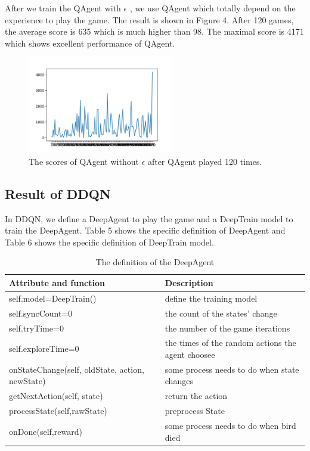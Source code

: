 \documentclass[conference,compsoc]{IEEEtran}
\begin{document}
\indent After we train the QAgent with ${\epsilon}$ , we use QAgent which totally depend on the experience to play the game. The result is shown in Figure 4.  After 120 games, the average score is 635 which is much higher than 98. The maximal score is 4171 which shows excellent performance of QAgent.

\begin{figure}[!t]
\centering
\includegraphics[width=2.5in]{Qlearn_noEp_result.png}
\caption{The scores of QAgent without ${\epsilon}$ after QAgent played 120 times.}
\label{fig3}
\end{figure}

\subsection{Result of DDQN}
In DDQN, we define a DeepAgent to play the game and a DeepTrain model to train the DeepAgent. Table 5 shows the specific definition of DeepAgent and Table 6 shows the specific definition of DeepTrain model.

\begin{table}[!t]
\renewcommand{\arraystretch}{1.3}
\caption{The definition of the DeepAgent}
\label{table_5}
\centering
\begin{tabular}{|p{110pt}|p{110pt}|}
\hline
Attribute and function & Description\\
\hline
self.model=DeepTrain() & define the training model\\
\hline
self.syncCount=0 & the count of the states’ change\\
\hline
self.tryTime=0 & the number of the game iterations\\
\hline
self.exploreTime=0 & the times of the random actions the agent choosee\\
\hline
onStateChange(self, oldState, action, newState) & some process needs to do when state changes\\
\hline
getNextAction(self, state) & return the action\\
\hline
processState(self,rawState) & preprocess State\\
\hline
onDone(self,reward) & some process needs to do when bird died\\
\hline
\end{tabular}
\end{table}
\end{document}
